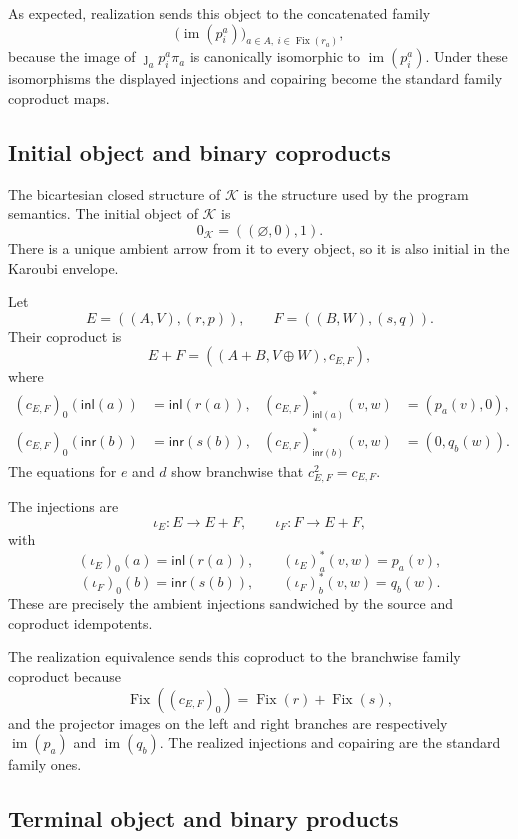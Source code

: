 \documentclass[runningheads,envcountsame]{llncs}
\newcommand{\Fix}{\operatorname{Fix}}
\newcommand{\im}{\operatorname{im}}
\begin{document}
As expected, realization sends this object to the concatenated family
$$
\bigl(\im(p^a_i)\bigr)_{a\in A,\ i\in\Fix(r_a)},
$$
because the image of $\jmath_a p^a_i\pi_a$ is canonically isomorphic to $\im(p^a_i)$. Under these isomorphisms the displayed injections and copairing become the standard family coproduct maps.


\subsection{Initial object and binary coproducts}
The bicartesian closed structure of $\mathcal K$ is the structure used by the
program semantics. The initial object of $\mathcal K$ is
$$
0_{\mathcal K}=((\varnothing,0),1).
$$
There is a unique ambient arrow from it to every object, so it is also
initial in the Karoubi envelope.

Let
$$
E=((A,V),(r,p)),
\qquad
F=((B,W),(s,q)).
$$
Their coproduct is
\begin{equation}
	E+F
	=
	\left(
	(A+B,V\oplus W),c_{E,F}
	\right),
	\label{eq:kar-coproduct-concrete}
\end{equation}
where
$$
\begin{aligned}
	(c_{E,F})_0(\mathsf{inl}(a))&=\mathsf{inl}(r(a)),
	&
	(c_{E,F})^*_{\mathsf{inl}(a)}(v,w)&=(p_a(v),0),\\
	(c_{E,F})_0(\mathsf{inr}(b))&=\mathsf{inr}(s(b)),
	&
	(c_{E,F})^*_{\mathsf{inr}(b)}(v,w)&=(0,q_b(w)).
\end{aligned}
$$
The equations for $e$ and $d$ show branchwise that $c_{E,F}^2=c_{E,F}$.

The injections are
$$
\iota_E:E\longrightarrow E+F,
\qquad
\iota_F:F\longrightarrow E+F,
$$
with
$$
(\iota_E)_0(a)=\mathsf{inl}(r(a)),
\qquad
(\iota_E)_a^*(v,w)=p_a(v),
$$
$$
(\iota_F)_0(b)=\mathsf{inr}(s(b)),
\qquad
(\iota_F)_b^*(v,w)=q_b(w).
$$
These are precisely the ambient injections sandwiched by the source and
coproduct idempotents.


The realization equivalence sends this coproduct to the branchwise family
coproduct because
$$
\Fix((c_{E,F})_0)=\Fix(r)+\Fix(s),
$$
and the projector images on the left and right branches are respectively
$\im(p_a)$ and $\im(q_b)$. The realized injections and copairing are the
standard family ones.










\subsection{Terminal object and binary products}
\end{document}
